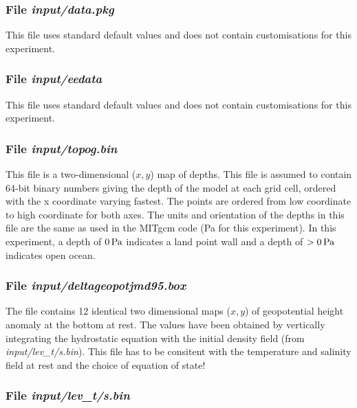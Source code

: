 {\begin{small}

\end{small}

\subsubsection{File {\it input/data.pkg}}

This file uses standard default values and does not contain
customisations for this experiment.

\subsubsection{File {\it input/eedata}}

This file uses standard default values and does not contain
customisations for this experiment.

\subsubsection{File {\it input/topog.bin}}

This file is a two-dimensional ($x,y$) map of
depths. This file is assumed to contain 64-bit binary numbers giving
the depth of the model at each grid cell, ordered with the x
coordinate varying fastest. The points are ordered from low
coordinate to high coordinate for both axes. The units and
orientation of the depths in this file are the same as used in the
MITgcm code (Pa for this experiment). In this experiment, a depth of
$0\mbox{\,Pa}$ indicates a land point wall and a depth of
$>0\mbox{\,Pa}$ indicates open ocean.

\subsubsection{File {\it input/deltageopotjmd95.box}}

The file contains 12 identical two dimensional maps ($x,y$) of
geopotential height anomaly at the bottom at rest. The values have
been obtained by vertically integrating the hydrostatic equation with
the initial density field (from {\it input/lev\_t/s.bin}). This file
has to be consitent with the temperature and salinity field at rest
and the choice of equation of state!

\subsubsection{File {\it input/lev\_t/s.bin}}

}

